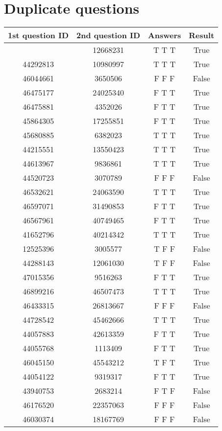 \section{Duplicate questions}
\begin{longtable}[c]{c c c c}
	\hline
	\textbf{1st question ID} & \textbf{2nd question ID} & \textbf{Answers} & \textbf{Result} \\
	\hline \hline
	\endfirsthead
	\hline
	\endhead
	\hline
	\endfoot
	\endlastfoot
	46871818 & 12668231 & T T T & True \\
	44292813 & 10980997 & T T T & True \\
	46044661 & 3650506 & F F F & False \\
	46475177 & 24025340 & F T T & True \\
	46475881 & 4352026 & F T T & True \\
	45864305 & 17255851 & F T T & True \\
	45680885 & 6382023 & T T T & True \\
	44215551 & 13550423 & T T T & True \\
	44613967 & 9836861 & T T T & True \\
	44520723 & 3070789 & F F F & False \\
	46532621 & 24063590 & T T T & True \\
	46597071 & 31490853 & F T T & True \\
	46567961 & 40749465 & F T T & True \\
	41652796 & 40214342 & T T T & True \\
	12525396 & 3005577 & T F F & False \\
	44288143 & 12061030 & T F F & False \\
	47015356 & 9516263 & F T T & True \\
	46899216 & 46507473 & T T T & True \\
	46433315 & 26813667 & F F F & False \\
	44728542 & 45462666 & T T T & True \\
	44057883 & 42613359 & F T T & True \\
	44055768 & 1113409 & F T T & True \\
	46045150 & 45543212 & T F T & True \\
	44054122 & 9319317 & F T T & True \\
	43940753 & 2683214 & F T F & False \\
	46176520 & 22357063 & F F F & False \\
	46030374 & 18167769 & F F F & False \\

\end{longtable}
